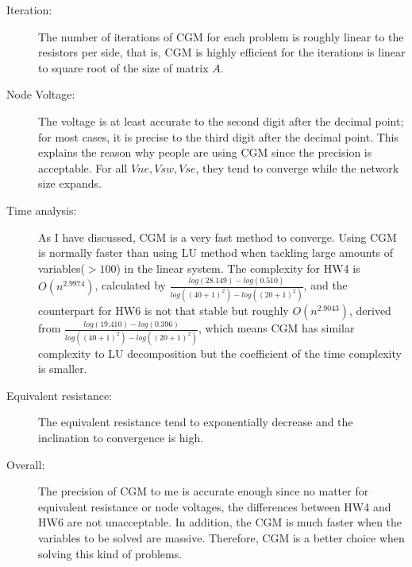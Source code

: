 \documentclass[12pt,a4paper]{article}
\begin{document}
\begin{description}

\item [Iteration:] The number of iterations of CGM for each problem is roughly linear to the resistors per side, that is, CGM is highly efficient for the iterations is linear to square root of the size of matrix $A$.
\item [Node Voltage:] The voltage is at least accurate to the second digit after the decimal point; for most cases, it is precise to the third digit after the decimal point. This explains the reason why people are using CGM since the precision is acceptable. For all $Vne, Vsw, Vse$, they tend to converge while the network size expands.
\item [Time analysis:] As I have discussed, CGM is a very fast method to converge. Using CGM is normally faster than using LU method when 
tackling large amounts of variables($>100$) in the linear system. The complexity for HW4 is $O(n^{2.9974})$, calculated by $\frac{log(28.149) - log(0.510)}{log((40+1)^2) - log((20+1)^2)}$, and the 
counterpart for HW6 is not that stable but roughly $O(n^{2.9043})$, derived from $\frac{log(19.410) - log(0.396)}{log((40+1)^2) - log((20+1)^2)}$, which means CGM has similar complexity to LU decomposition but the coefficient of the time complexity is smaller.
\item [Equivalent resistance:] The equivalent resistance tend to exponentially decrease and the inclination to convergence is high.
\item [Overall:] The precision of CGM to me is accurate enough since no matter for equivalent resistance or node voltages, the differences between HW4 and HW6 are not unacceptable. In addition, the CGM is much faster when the variables to be solved are massive. Therefore, CGM is a better choice when solving this kind of problems.
\end{description}
\end{document}
